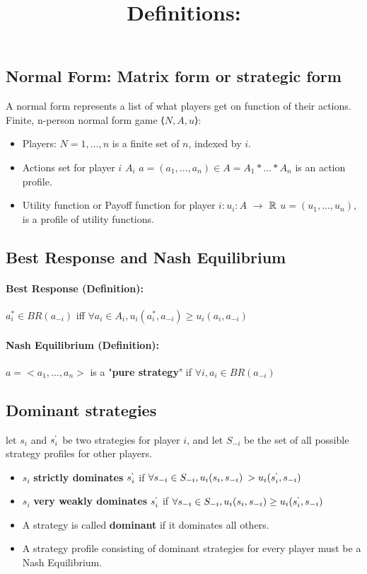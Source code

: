 \subsection{Normal Form: Matrix form or strategic form}
A normal form represents a list of what players get on function of their actions.
Finite, n-person normal form game  ⟨$N, A, u$⟩:
\begin{itemize}
\item Players: $ N = {1, ... , n} $ is a finite set of $n$, indexed by $i$.
\item Actions set for player $i$ $A_i$
\subitem $a = (a_1,...,a_n) \in A = A_1 * ... * A_n $ is an action profile.
\item Utility function or Payoff function for player $i: u_i : A $  $\to$ ${\Bbb{R}}$
\subitem $u = (u_1,..., u_n)$, is a profile of utility functions.
\end{itemize}
\subsection{Best Response and Nash Equilibrium}
\paragraph{Best Response (Definition):}
$a_i^* \in BR(a_{-i}) $ iff $  \forall a_i \in A_i, u_i(a_i^*,a_{-i}) \geq u_i(a_i, a_{-i})$  
\paragraph{Nash Equilibrium (Definition):}
$a = <a_1,...,a_n>$ is a "\textbf{pure strategy}" if $\forall i, a_i \in BR(a_{-i})$
\subsection{Dominant strategies}
let $s_i$ and $s_i^`$ be two strategies for player $i$, and let $S_{-i}$ be the set of all possible strategy profiles for other players.
\bigbreak
\title{\textbf{Definitions:} }
\begin{itemize}
\item $s_i$ \textbf{strictly dominates} $s_i^`$ if $\forall s_{-i} \in S_{-i}, u_i(s_i, s_{-i}) \>> u_i(s_i^`, s_{-i})$
\item $s_i$ \textbf{very weakly dominates} $s_i^`$ if $\forall s_{-i} \in S_{-i}, u_i(s_i, s_{-i}) \geq u_i(s_i^`, s_{-i})$
\item A strategy is called \textbf{dominant} if it dominates all others.
\item A strategy profile consisting of dominant strategies for every player must be a Nash Equilibrium.
\end{itemize}
